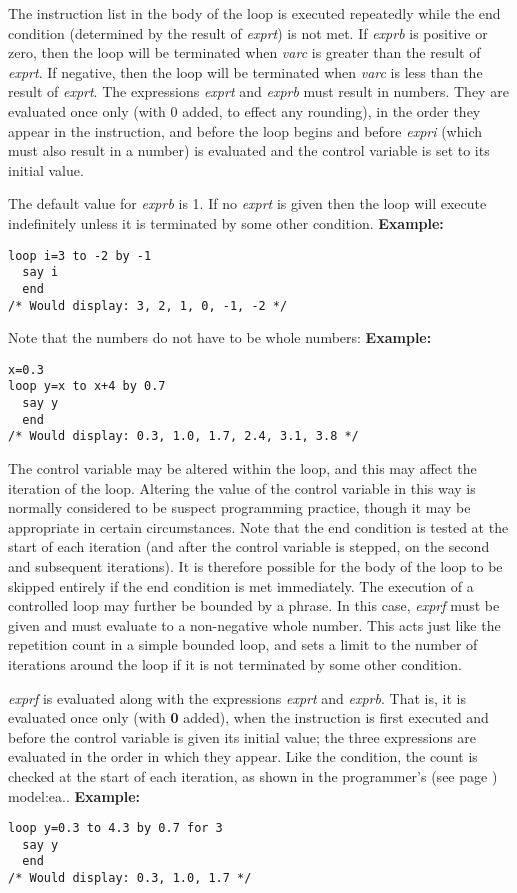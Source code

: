 \begin{description}
The instruction list in the body of the loop is executed repeatedly
while the end condition (determined by the result of \emph{exprt})
is not met.
If \emph{exprb} is positive or zero, then the loop will be
terminated when \emph{varc} is greater than the result of
\emph{exprt}.
If negative, then the loop will be terminated when \emph{varc} is
less than the result of \emph{exprt}.
 The expressions \emph{exprt} and \emph{exprb} must result in
numbers.
They are evaluated once only (with 0 added, to effect any
rounding), in the order they appear in the instruction, and before the
loop begins and before \emph{expri} (which must also result in a
number) is evaluated and the control variable is set to its initial
value.
 
The default value for \emph{exprb} is 1.
If no \emph{exprt} is given then the loop will execute indefinitely
unless it is terminated by some other condition.
 \textbf{Example:}
\begin{lstlisting}
loop i=3 to -2 by -1
  say i
  end
/* Would display: 3, 2, 1, 0, -1, -2 */
\end{lstlisting}
Note that the numbers do not have to be whole numbers:
 \textbf{Example:}
\begin{lstlisting}
x=0.3
loop y=x to x+4 by 0.7
  say y
  end
/* Would display: 0.3, 1.0, 1.7, 2.4, 3.1, 3.8 */
\end{lstlisting}
 The control variable may be altered within the loop, and this may
affect the iteration of the loop.
Altering the value of the control variable in this way is normally
considered to be suspect programming practice, though it may be
appropriate in certain circumstances.
 Note that the end condition is tested at the start of each iteration
(and after the control variable is stepped, on the second and
subsequent iterations).  It is therefore possible for the body of the
loop to be skipped entirely if the end condition is met immediately.
 The execution of a controlled loop may further be bounded by a
 phrase.
In this case, \emph{exprf} must be given and must evaluate to a
non-negative whole number.
This acts just like the repetition count in a simple bounded loop, and
sets a limit to the number of iterations around the loop if it is not
terminated by some other condition.
 
\emph{exprf} is evaluated along with the expressions
\emph{exprt} and \emph{exprb}.
That is, it is evaluated once only (with \textbf{0} added), when the
 instruction is first executed and before the control
variable is given its initial value; the three expressions are evaluated
in the order in which they appear.
Like the  condition, the  count is checked at the
start of each iteration, as shown in the  programmer's (see page \pageref{refloopmod}) 
model:ea..
 \textbf{Example:}
\begin{lstlisting}
loop y=0.3 to 4.3 by 0.7 for 3
  say y
  end
/* Would display: 0.3, 1.0, 1.7 */
\end{lstlisting}
 

\end{description}
